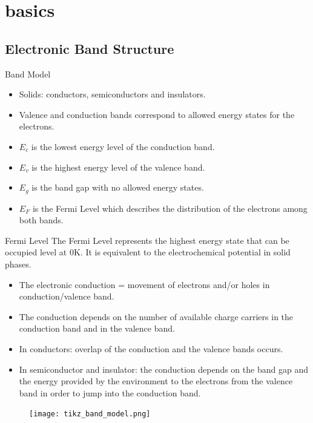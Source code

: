 \documentclass[10pt,compress]{beamer}
\begin{document}
\section{basics}
\subsection{Electronic Band Structure}
    \begin{frame}[allowframebreaks=1.0]{Band Model}
        \begin{itemize}
            \item Solids: conductors, semiconductors and insulators. 
            \item Valence and conduction bands correspond to allowed energy states for the electrons. 
            \item $E_c$ is the lowest energy level of the conduction band.
            \item $E_v$ is the highest energy level of the valence band.
            \item $E_g$ is the band gap with no allowed energy states. 
            \item $E_F$ is the Fermi Level which describes the distribution of the electrons among both bands.
        \end{itemize}
        
        \begin{alertblock}{Fermi Level}
            \footnotesize
            The Fermi Level represents the highest energy state that can be occupied level at 0K. 
            It is equivalent to the electrochemical potential in solid phases.
        \end{alertblock}
        
        \framebreak
        \begin{itemize}
            \item The electronic conduction = movement of electrons and/or holes in conduction/valence band.
            \item The conduction depends on the number of available charge carriers
            in the conduction band and in the valence band. 
            \item In conductors: overlap of the conduction and the valence bands occurs. 
            \item In semiconductor and insulator: the conduction depends on the band gap and the energy provided by 
            the environment to the electrons from the valence band in order to jump 
            into the conduction band.
        \end{itemize}

        \begin{figure}[h]
            \centering
                \texttt{[image: tikz\_band\_model.png]}
            \label{fig_band_model}
        \end{figure}
    \end{frame}
\end{document}
